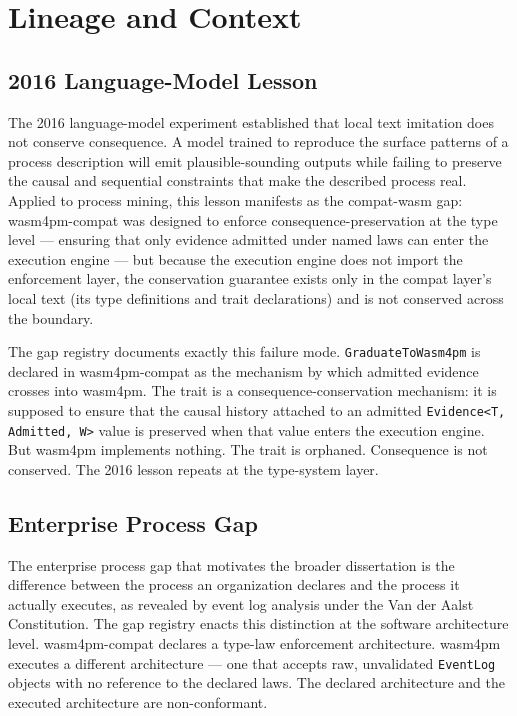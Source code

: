 
\section{Lineage and Context}
\label{sec:gaps-lineage}

\subsection{2016 Language-Model Lesson}
\label{sec:gaps-lineage-2016}

The 2016 language-model experiment established that local text imitation does not
conserve consequence. A model trained to reproduce the surface patterns of a process
description will emit plausible-sounding outputs while failing to preserve the causal
and sequential constraints that make the described process real. Applied to process
mining, this lesson manifests as the compat-wasm gap: wasm4pm-compat was designed to
enforce consequence-preservation at the type level — ensuring that only evidence
admitted under named laws can enter the execution engine — but because the execution
engine does not import the enforcement layer, the conservation guarantee exists only
in the compat layer's local text (its type definitions and trait declarations) and is
not conserved across the boundary.

The gap registry documents exactly this failure mode. \texttt{GraduateToWasm4pm} is
declared in wasm4pm-compat as the mechanism by which admitted evidence crosses into
wasm4pm. The trait is a consequence-conservation mechanism: it is supposed to ensure
that the causal history attached to an admitted \texttt{Evidence<T, Admitted, W>} value
is preserved when that value enters the execution engine. But wasm4pm implements nothing.
The trait is orphaned. Consequence is not conserved. The 2016 lesson repeats at the
type-system layer.

\subsection{Enterprise Process Gap}
\label{sec:gaps-lineage-enterprise}

The enterprise process gap that motivates the broader dissertation is the difference
between the process an organization declares and the process it actually executes, as
revealed by event log analysis under the Van der Aalst Constitution. The gap registry
enacts this distinction at the software architecture level. wasm4pm-compat declares
a type-law enforcement architecture. wasm4pm executes a different architecture — one
that accepts raw, unvalidated \texttt{EventLog} objects with no reference to the declared
laws. The declared architecture and the executed architecture are non-conformant.


